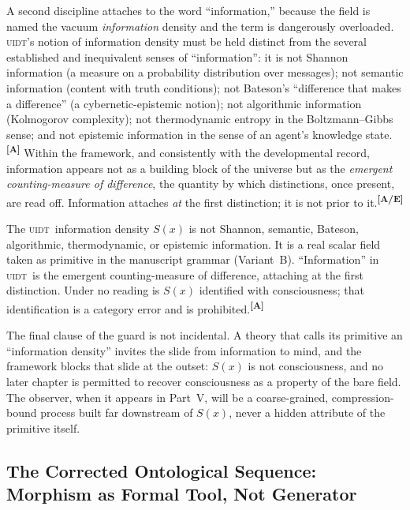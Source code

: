\documentclass[12pt,a4paper,twoside]{article}
\theoremstyle{plain}
\theoremstyle{definition}
\theoremstyle{remark}
\newcommand{\UIDT}{\textsc{uidt}}
\newcommand{\catmark}[1]{\textsuperscript{\textsf{\textbf{[#1]}}}}
\begin{document}
A second discipline attaches to the word ``information,'' because the field is named the vacuum \emph{information} density and the term is dangerously overloaded. \UIDT's notion of information density must be held distinct from the several established and inequivalent senses of ``information'': it is not Shannon information (a measure on a probability distribution over messages); not semantic information (content with truth conditions); not Bateson's ``difference that makes a difference'' (a cybernetic-epistemic notion); not algorithmic information (Kolmogorov complexity); not thermodynamic entropy in the Boltzmann--Gibbs sense; and not epistemic information in the sense of an agent's knowledge state.\catmark{A} Within the framework, and consistently with the developmental record, information appears not as a building block of the universe but as the \emph{emergent counting-measure of difference}, the quantity by which distinctions, once present, are read off. Information attaches \emph{at} the first distinction; it is not prior to it.\catmark{A/E}

\begin{governancebox}
The \UIDT\ information density $S(x)$ is not Shannon, semantic, Bateson, algorithmic, thermodynamic, or epistemic information. It is a real scalar field taken as primitive in the manuscript grammar (Variant~B). ``Information'' in \UIDT\ is the emergent counting-measure of difference, attaching at the first distinction. Under no reading is $S(x)$ identified with consciousness; that identification is a category error and is prohibited.\catmark{A}
\end{governancebox}

\noindent The final clause of the guard is not incidental. A theory that calls its primitive an ``information density'' invites the slide from information to mind, and the framework blocks that slide at the outset: $S(x)$ is not consciousness, and no later chapter is permitted to recover consciousness as a property of the bare field. The observer, when it appears in Part~V, will be a coarse-grained, compression-bound process built far downstream of $S(x)$, never a hidden attribute of the primitive itself.

\subsection{The Corrected Ontological Sequence: Morphism as Formal Tool, Not Generator}
\label{subsec:corrected-sequence}
\end{document}
